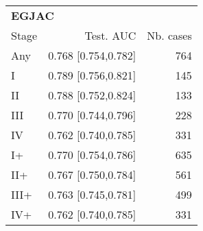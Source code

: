 \begin{table}[ht]
\centering
\begin{tabular}{lrr}
  \toprule
  \multicolumn{3}{l}{\textbf{EGJAC}}\\
Stage & Test. AUC & Nb. cases \\ 
  \midrule
Any & 0.768 [0.754,0.782] & 764 \\ 
   \addlinespace
I & 0.789 [0.756,0.821] & 145 \\ 
  II & 0.788 [0.752,0.824] & 133 \\ 
  III & 0.770 [0.744,0.796] & 228 \\ 
  IV & 0.762 [0.740,0.785] & 331 \\ 
   \addlinespace
I+ & 0.770 [0.754,0.786] & 635 \\ 
  II+ & 0.767 [0.750,0.784] & 561 \\ 
  III+ & 0.763 [0.745,0.781] & 499 \\ 
  IV+ & 0.762 [0.740,0.785] & 331 \\ 
   \bottomrule
\end{tabular}
\end{table}
